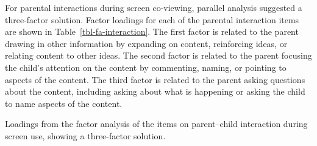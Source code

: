 \documentclass[
  man,
  floatsintext,
  longtable,
  nolmodern,
  notxfonts,
  notimes,
  colorlinks=true,linkcolor=blue,citecolor=blue,urlcolor=blue]{apa7}
\begin{document}
For parental interactions during screen co-viewing, parallel analysis
suggested a three-factor solution. Factor loadings for each of the
parental interaction items are shown in Table~\ref{tbl-fa-interaction}.
The first factor is related to the parent drawing in other information
by expanding on content, reinforcing ideas, or relating content to other
ideas. The second factor is related to the parent focusing the child's
attention on the content by commenting, naming, or pointing to aspects
of the content. The third factor is related to the parent asking
questions about the content, including asking about what is happening or
asking the child to name aspects of the content.

\begin{table}

{\caption{{Loadings from the factor analysis of the items on
parent--child interaction during screen use, showing a three-factor
solution.}{\label{tbl-fa-interaction}}}}


\end{table}
\end{document}
